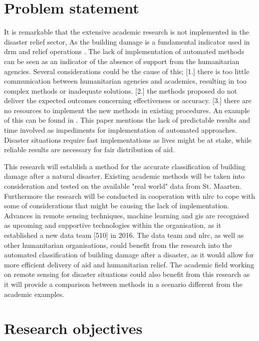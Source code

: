 \section{Problem statement}
It is remarkable that the extensive academic research is not implemented in the disaster relief sector, As the building damage is a fundamental indicator used in \ac{drm} and relief operations \citep{Schweier2006}. The lack of implementation of automated methods can be seen as an indicator of the absence of support from the humanitarian agencies. Several considerations could be the cause of this; [1.] there is too little communication between humanitarian agencies and academics, resulting in too complex methods or inadequate solutions. [2.] the methods proposed do not deliver the expected outcomes concerning effectiveness or accuracy. [3.] there are no resources to implement the new methods in existing procedures. An example of this can be found in \citet{Ajmar2011}. This paper mentions the lack of predictable results and time involved as impediments for implementation of automated approaches. Disaster situations require fast implementations as lives might be at stake, while reliable results are necessary for fair distribution of aid. 

This research will establish a method for the accurate classification of building damage after a natural disaster. Existing academic methods will be taken into consideration and tested on the available "real world" data from St. Maarten. Furthermore the research will be conducted in cooperation with \ac{nlrc} to cope with some of considerations that might be causing the lack of implementation. Advances in remote sensing techniques, machine learning and \ac{gis} are recognised as upcoming and supportive technologies within the organisation, as it established a new data team [510] in 2016. The data team and \ac{nlrc}, as well as other humanitarian organisations, could benefit from the research into the automated classification of building damage after a disaster, as it would allow for more efficient delivery of aid and humanitarian relief. The academic field working on remote sensing for disaster situations could also benefit from this research as it will provide a comparison between methods in a scenario different from the academic examples.

\section{Research objectives}


